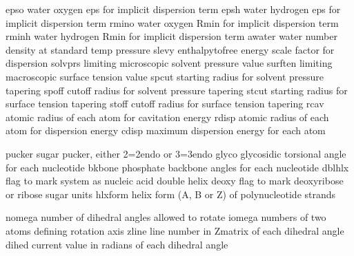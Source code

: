 \documentclass[letterpaper,11pt,english]{sphinxmanual}
\begin{document}

\begin{sphinxVerbatim}[commandchars=\\\{\}]
epso            water oxygen eps for implicit dispersion term
epsh            water hydrogen eps for implicit dispersion term
rmino           water oxygen Rmin for implicit dispersion term
rminh           water hydrogen Rmin for implicit dispersion term
awater          water number density at standard temp \PYGZam{} pressure
slevy           enthalpy\PYGZhy{}to\PYGZhy{}free energy scale factor for dispersion
solvprs         limiting microscopic solvent pressure value
surften         limiting macroscopic surface tension value
spcut           starting radius for solvent pressure tapering
spoff           cutoff radius for solvent pressure tapering
stcut           starting radius for surface tension tapering
stoff           cutoff radius for surface tension tapering
rcav            atomic radius of each atom for cavitation energy
rdisp           atomic radius of each atom for dispersion energy
cdisp           maximum dispersion energy for each atom
\end{sphinxVerbatim}


\begin{sphinxVerbatim}[commandchars=\\\{\}]
pucker          sugar pucker, either 2=2\PYGZsq{}\PYGZhy{}endo or 3=3\PYGZsq{}\PYGZhy{}endo
glyco           glycosidic torsional angle for each nucleotide
bkbone          phosphate backbone angles for each nucleotide
dblhlx          flag to mark system as nucleic acid double helix
deoxy           flag to mark deoxyribose or ribose sugar units
hlxform         helix form (A, B or Z) of polynucleotide strands
\end{sphinxVerbatim}


\begin{sphinxVerbatim}[commandchars=\\\{\}]
nomega          number of dihedral angles allowed to rotate
iomega          numbers of two atoms defining rotation axis
zline           line number in Z\PYGZhy{}matrix of each dihedral angle
dihed           current value in radians of each dihedral angle
\end{sphinxVerbatim}
\end{document}
